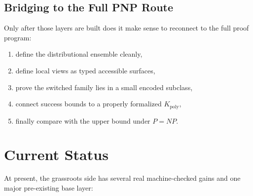 \documentclass[11pt]{article}
\theoremstyle{remark}
\begin{document}
\subsection{Bridging to the Full PNP Route}

Only after those layers are built does it make sense to reconnect to the full
proof program:
\begin{enumerate}[leftmargin=1.5em]
  \item define the distributional ensemble cleanly,
  \item define local views as typed accessible surfaces,
  \item prove the switched family lies in a small encoded subclass,
  \item connect success bounds to a properly formalized \(K_{\mathrm{poly}}\),
  \item finally compare with the upper bound under \(P=NP\).
\end{enumerate}

\section{Current Status}

At present, the grassroots side has several real machine-checked gains and one
major pre-existing base layer:
\end{document}

